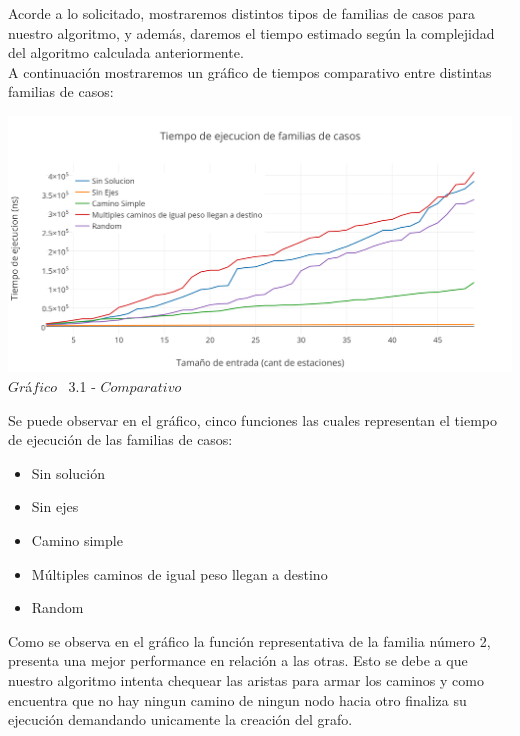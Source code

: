\indent Acorde a lo solicitado, mostraremos distintos tipos de familias de casos para nuestro algoritmo, y adem\'as, daremos el tiempo estimado 
seg\'un la complejidad del algoritmo calculada anteriormente.\\

A continuaci\'on mostraremos un gr\'afico de tiempos comparativo entre distintas familias de casos:\\ 

\vspace*{0.3cm} \vspace*{0.3cm}
  \begin{center}
 \includegraphics[scale=0.65]{./EJ3/comparativo.png}
 {$Gr$\'a$fico$ \ 3.1 - $Comparativo$}
  \end{center}
  \vspace*{0.3cm}
  
Se puede observar en el gr\'afico, cinco funciones las cuales representan el tiempo de ejecuci\'on de las familias de casos:\\
\begin{itemize}
\item Sin solución
\item Sin ejes
\item Camino simple
\item Múltiples caminos de igual peso llegan a destino
\item Random
\end{itemize}

Como se observa en el gr\'afico la funci\'on representativa de la familia n\'umero 2, presenta una mejor performance en relaci\'on a las otras. Esto se debe a que nuestro algoritmo intenta chequear las aristas para armar los caminos y como encuentra que no hay ningun camino de ningun nodo hacia otro finaliza su ejecuci\'on demandando unicamente la creaci\'on del grafo.

